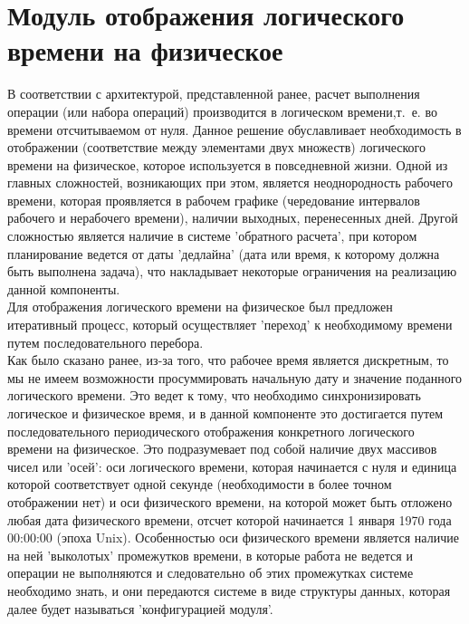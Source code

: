 \section{Модуль отображения логического времени на физическое}
\indent В соответствии с архитектурой, представленной ранее, расчет выполнения операции (или набора операций) производится в логическом времени,т.~е. во времени отсчитываемом от нуля.
Данное решение обуславливает необходимость в отображении (соответствие между элементами двух множеств) логического времени на физическое, которое используется в повседневной жизни.
Одной из главных сложностей, возникающих при этом, является неоднородность рабочего времени, которая проявляется в рабочем графике (чередование интервалов рабочего и нерабочего времени), наличии выходных, перенесенных дней.
Другой сложностью является наличие в системе 'обратного расчета', при котором планирование ведется от даты 'дедлайна' (дата или время, к которому должна быть выполнена задача), что накладывает некоторые ограничения на реализацию данной компоненты.\\
\indent Для отображения логического времени на физическое был предложен итеративный процесс, который осуществляет 'переход' к необходимому времени путем последовательного перебора.\\
\indent Как было сказано ранее, из-за того, что рабочее время является дискретным, то мы не имеем возможности просуммировать начальную дату и значение поданного логического времени. 
Это ведет к тому, что необходимо синхронизировать логическое и физическое время, и в данной компоненте это достигается путем последовательного периодического отображения конкретного логического времени на физическое.
Это подразумевает под собой наличие двух массивов чисел или 'осей': оси логического времени, которая начинается с нуля и единица которой соответствует одной секунде (необходимости в более точном отображении нет) и оси физического времени, на которой может быть отложено любая дата физического времени, отсчет которой начинается 1 января 1970 года 00:00:00 (эпоха Unix).
Особенностью оси физического времени является наличие на ней 'выколотых' промежутков времени, в которые работа не ведется и операции не выполняются и следовательно об этих промежутках системе необходимо знать, и они передаются системе в виде структуры данных, которая далее будет называться 'конфигурацией модуля'.\\

